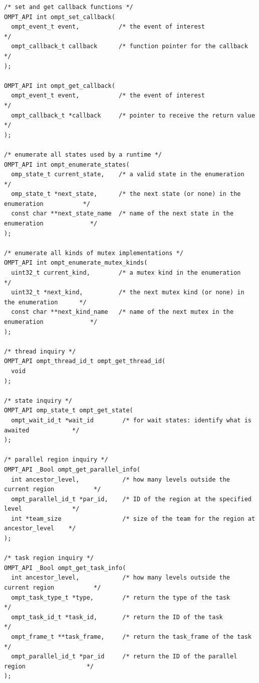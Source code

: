 \documentclass{article}
\begin{document}
\begin{verbatim}
/* set and get callback functions */
OMPT_API int ompt_set_callback( 
  ompt_event_t event,           /* the event of interest                                 */
  ompt_callback_t callback      /* function pointer for the callback                     */
);

OMPT_API int ompt_get_callback(
  ompt_event_t event,           /* the event of interest                                 */
  ompt_callback_t *callback     /* pointer to receive the return value                   */
);

/* enumerate all states used by a runtime */
OMPT_API int ompt_enumerate_states(  
  omp_state_t current_state,    /* a valid state in the enumeration                      */
  omp_state_t *next_state,      /* the next state (or none) in the enumeration           */
  const char **next_state_name  /* name of the next state in the enumeration             */
);

/* enumerate all kinds of mutex implementations */
OMPT_API int ompt_enumerate_mutex_kinds(  
  uint32_t current_kind,        /* a mutex kind in the enumeration                       */
  uint32_t *next_kind,          /* the next mutex kind (or none) in the enumeration      */
  const char **next_kind_name   /* name of the next mutex in the enumeration             */
);

/* thread inquiry */
OMPT_API ompt_thread_id_t ompt_get_thread_id(
  void
);

/* state inquiry */
OMPT_API omp_state_t ompt_get_state( 
  ompt_wait_id_t *wait_id        /* for wait states: identify what is awaited            */
);

/* parallel region inquiry */
OMPT_API _Bool ompt_get_parallel_info(
  int ancestor_level,            /* how many levels outside the current region           */
  ompt_parallel_id_t *par_id,    /* ID of the region at the specified level              */
  int *team_size                 /* size of the team for the region at ancestor_level    */
);

/* task region inquiry */
OMPT_API _Bool ompt_get_task_info(
  int ancestor_level,            /* how many levels outside the current region           */
  ompt_task_type_t *type,        /* return the type of the task                          */
  ompt_task_id_t *task_id,       /* return the ID of the task                            */
  ompt_frame_t **task_frame,     /* return the task_frame of the task                    */
  ompt_parallel_id_t *par_id     /* return the ID of the parallel region                 */
);


\end{verbatim}
\end{document}
